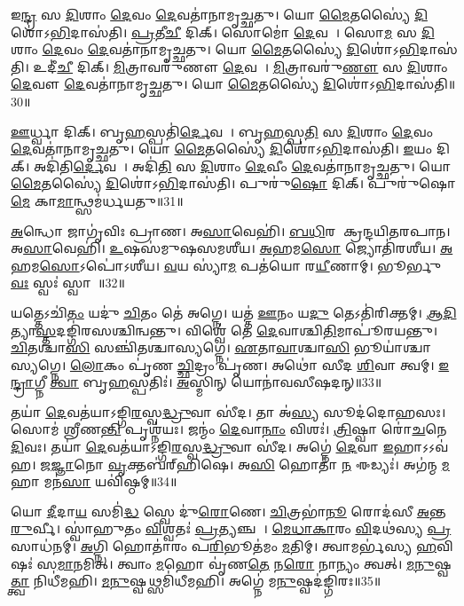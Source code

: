    𑌇\ul{𑌨𑍍𑌦𑍍𑌰}\ul{} 𑌸 \ul{𑌦𑌿}𑌶𑌾𑌂 \ul{𑌦𑍇}𑌵𑌂 \ul{𑌦𑍇}𑌵𑌤𑌾॑𑌨𑌾𑌮𑍃𑌚𑍍𑌛𑌤𑍁।
   𑌯𑍋 \ul{𑌮𑍈}𑌤𑌸𑍍𑌯𑍈॑ \ul{𑌦𑌿}𑌶𑍋॑𑌽\ul{𑌭𑌿}𑌦𑌾𑌸॑𑌤𑌿।
   \ul{𑌪𑍍𑌰}𑌤𑍀\ul{𑌚𑍀} 𑌦𑌿𑌕𑍍।
   𑌸𑍋𑌮𑍋॑ \ul{𑌦𑍇}𑌵𑌤𑌾᳚।
   𑌸𑍋\ul{𑌮}\ul{} 𑌸 \ul{𑌦𑌿}𑌶𑌾𑌂 \ul{𑌦𑍇}𑌵𑌂 \ul{𑌦𑍇}𑌵𑌤𑌾॑𑌨𑌾𑌮𑍃𑌚𑍍𑌛𑌤𑍁।
   𑌯𑍋 \ul{𑌮𑍈}𑌤𑌸𑍍𑌯𑍈॑ \ul{𑌦𑌿}𑌶𑍋॑𑌽\ul{𑌭𑌿}𑌦𑌾𑌸॑𑌤𑌿।
   𑌉𑌦𑍀॑\ul{𑌚𑍀} 𑌦𑌿𑌕𑍍।
   \ul{𑌮𑌿}𑌤𑍍𑌰𑌾𑌵𑌰𑍁॑𑌣𑍗 \ul{𑌦𑍇}𑌵𑌤𑌾᳚।
   \ul{𑌮𑌿}𑌤𑍍𑌰𑌾𑌵𑌰𑍁॑\ul{𑌣𑍗} 𑌸 \ul{𑌦𑌿}𑌶𑌾𑌂 \ul{𑌦𑍇}𑌵𑍗 \ul{𑌦𑍇}𑌵𑌤𑌾॑𑌨𑌾𑌮𑍃𑌚𑍍𑌛𑌤𑍁।
   𑌯𑍋 \ul{𑌮𑍈}𑌤𑌸𑍍𑌯𑍈॑ \ul{𑌦𑌿}𑌶𑍋॑𑌽\ul{𑌭𑌿}𑌦𑌾𑌸॑𑌤𑌿॥30॥

   \ul{𑌊}𑌰𑍍𑌧𑍍𑌵𑌾 𑌦𑌿𑌕𑍍।
   𑌬𑍃\ul{𑌹}𑌸𑍍𑌪𑌤𑌿॑\ul{𑌰𑍍𑌦𑍇}𑌵𑌤𑌾᳚।
   𑌬𑍃\ul{𑌹}𑌸𑍍𑌪\ul{𑌤𑌿}\ul{} 𑌸 \ul{𑌦𑌿}𑌶𑌾𑌂 \ul{𑌦𑍇}𑌵𑌂 \ul{𑌦𑍇}𑌵𑌤𑌾॑𑌨𑌾𑌮𑍃𑌚𑍍𑌛𑌤𑍁।
   𑌯𑍋 \ul{𑌮𑍈}𑌤𑌸𑍍𑌯𑍈॑ \ul{𑌦𑌿}𑌶𑍋॑𑌽\ul{𑌭𑌿}𑌦𑌾𑌸॑𑌤𑌿।
   \ul{𑌇}𑌯𑌂 𑌦𑌿𑌕𑍍।
   𑌅𑌦𑌿॑𑌤𑌿\ul{𑌰𑍍𑌦𑍇}𑌵𑌤𑌾᳚।
   𑌅𑌦𑌿॑\ul{𑌤𑌿}\ul{} 𑌸 \ul{𑌦𑌿}𑌶𑌾𑌂 \ul{𑌦𑍇}𑌵𑍀𑌂 \ul{𑌦𑍇}𑌵𑌤𑌾॑𑌨𑌾𑌮𑍃𑌚𑍍𑌛𑌤𑍁।
   𑌯𑍋 \ul{𑌮𑍈}𑌤𑌸𑍍𑌯𑍈॑ \ul{𑌦𑌿}𑌶𑍋॑𑌽\ul{𑌭𑌿}𑌦𑌾𑌸॑𑌤𑌿।
   𑌪𑍁𑌰𑍁॑\ul{𑌷𑍋} 𑌦𑌿𑌕𑍍।
   𑌪𑍁𑌰𑍁॑𑌷𑍋 \ul{𑌮𑍇} 𑌕𑌾\ul{𑌮𑌾}𑌨𑍍𑌥𑍍𑌸𑌮॑𑌰𑍍𑌧𑌯𑌤𑍁॥31॥
   
   \ul{𑌅}𑌨𑍍𑌧𑍋 𑌜𑌾𑌗𑍃॑𑌵𑌿𑌃 𑌪𑍍𑌰𑌾𑌣।
   𑌅\ul{𑌸𑌾}𑌵𑍇𑌹𑌿॑।
   \ul{𑌬}\ul{𑌧𑌿}𑌰 𑌆᳚𑌕𑍍𑌰𑌨𑍍𑌦𑌯𑌿𑌤𑌰𑌪𑌾𑌨।
   𑌅\ul{𑌸𑌾}𑌵𑍇𑌹𑌿॑।
   \ul{𑌉}𑌷𑌸॑𑌮𑍁𑌷𑌸𑌮𑌶𑍀𑌯।
   \ul{𑌅}𑌹𑌮\ul{𑌸𑍋} 𑌜𑍍𑌯𑍋𑌤𑌿॑𑌰𑌶𑍀𑌯।
   \ul{𑌅}𑌹𑌮\ul{𑌸𑍋}𑌽𑌪𑍋॑𑌽𑌶𑍀𑌯।
   \ul{𑌵}𑌯 𑌸𑍍𑌯𑌾॑\ul{𑌮} 𑌪𑌤॑𑌯𑍋 𑌰\ul{𑌯𑍀}𑌣𑌾𑌮𑍍।
   𑌭𑍂𑌰𑍍𑌭𑍁\ul{𑌵𑌃} 𑌸𑍍𑌵𑌃॑ 𑌸𑍍𑌵𑌾𑌹𑌾᳚॥32॥
\anuvakamend
  
   𑌯𑌤𑍍𑌤𑍇𑌽𑌚𑌿॑\ul{𑌤𑌂} 𑌯𑌦𑍁॑ \ul{𑌚𑌿}𑌤𑌂 𑌤𑍇॑ 𑌅𑌗𑍍𑌨𑍇।
   𑌯𑌤𑍍𑌤॑ \ul{𑌊}𑌨𑌂 𑌯\ul{𑌦𑍁} 𑌤𑍇𑌽𑌤𑌿॑𑌰𑌿𑌕𑍍𑌤𑌮𑍍।
   \ul{𑌆}\ul{𑌦𑌿}𑌤𑍍𑌯𑌾\ul{𑌸𑍍𑌤}𑌦𑌙𑍍𑌗𑌿॑𑌰𑌸𑌶𑍍𑌚𑌿𑌨𑍍𑌵𑌨𑍍𑌤𑍁।
   𑌵𑌿𑌶𑍍𑌵𑍇॑ 𑌤𑍇 \ul{𑌦𑍇}𑌵𑌾𑌶𑍍𑌚𑌿\ul{𑌤𑌿}𑌮𑌾𑌪𑍂॑𑌰𑌯𑌨𑍍𑌤𑍁।
   \ul{𑌚𑌿}𑌤𑌶𑍍𑌚𑌾\ul{𑌸𑌿} 𑌸𑌞𑍍𑌚𑌿॑𑌤𑌶𑍍𑌚𑌾𑌸𑍍𑌯𑌗𑍍𑌨𑍇।
   \ul{𑌏}𑌤𑌾\ul{𑌵𑌾}\ul{}𑌶𑍍𑌚𑌾\ul{𑌸𑌿} 𑌭𑍂𑌯𑌾॑𑌶𑍍𑌚𑌾𑌸𑍍𑌯𑌗𑍍𑌨𑍇।
   \ul{𑌲𑍋}𑌕𑌂 𑌪𑍃॑𑌣 \ul{𑌚𑍍𑌛𑌿}𑌦𑍍𑌰𑌂 𑌪𑍃॑𑌣।
   𑌅𑌥𑍋॑ 𑌸𑍀𑌦 \ul{𑌶𑌿}𑌵𑌾 𑌤𑍍𑌵𑌮𑍍।
   \ul{𑌇}\ul{𑌨𑍍𑌦𑍍𑌰𑌾}𑌗𑍍𑌨𑍀 \ul{𑌤𑍍𑌵𑌾} 𑌬𑍃\ul{𑌹}𑌸𑍍𑌪𑌤𑌿𑌃॑।
   \ul{𑌅}𑌸𑍍𑌮𑌿𑌨𑍍 𑌯𑍋𑌨𑌾॑𑌵𑌸𑍀𑌷𑌦𑌨𑍍॥33॥

   𑌤𑌯𑌾॑ \ul{𑌦𑍇}𑌵𑌤॑𑌯𑌾𑌽𑌙𑍍𑌗𑌿\ul{𑌰}𑌸𑍍𑌵\ul{𑌦𑍍𑌧𑍍𑌰𑍁}𑌵𑌾 𑌸𑍀॑𑌦।
   𑌤𑌾 𑌅॑\ul{𑌸𑍍𑌯} 𑌸𑍂𑌦॑𑌦𑍋𑌹𑌸𑌃।
   𑌸𑍋𑌮॑ 𑌶𑍍𑌰𑍀𑌣\ul{𑌨𑍍𑌤𑌿} 𑌪𑍃𑌶𑍍𑌨॑𑌯𑌃।
   𑌜𑌨𑍍𑌮𑌂॑ \ul{𑌦𑍇}𑌵𑌾\ul{𑌨𑌾𑌂} 𑌵𑌿𑌶𑌃॑।
   \ul{𑌤𑍍𑌰𑌿}𑌷𑍍𑌵𑌾 𑌰𑍋॑\ul{𑌚}𑌨𑍇 \ul{𑌦𑌿}𑌵𑌃।
   𑌤𑌯𑌾॑ \ul{𑌦𑍇}𑌵𑌤॑𑌯𑌾𑌽𑌙𑍍𑌗𑌿\ul{𑌰}𑌸𑍍𑌵\ul{𑌦𑍍𑌧𑍍𑌰𑍁}𑌵𑌾 𑌸𑍀॑𑌦।
   𑌅𑌗𑍍𑌨𑍇॑ \ul{𑌦𑍇}𑌵𑌾 \ul{𑌇}𑌹𑌾𑌽𑌽𑌵॑𑌹।
   \ul{𑌜}\ul{𑌜𑍍𑌞𑌾}𑌨𑍋 \ul{𑌵𑍃}𑌕𑍍𑌤𑌬॑𑌰𑍍{‌}𑌹𑌿𑌷𑍇।
   𑌅\ul{𑌸𑌿} 𑌹𑍋𑌤𑌾॑ \ul{𑌨} 𑌈𑌡𑍍𑌯𑌃॑।
   𑌅𑌗॑𑌨𑍍𑌮 \ul{𑌮}𑌹𑌾 𑌮𑌨॑\ul{𑌸𑌾} 𑌯𑌵𑌿॑𑌷𑍍𑌠𑌮𑍍॥34॥

   𑌯𑍋 \ul{𑌦𑍀}𑌦𑌾\ul{𑌯} 𑌸𑌮𑌿॑\ul{𑌦𑍍𑌧} 𑌸𑍍𑌵𑍇 𑌦𑍁॑\ul{𑌰𑍋}𑌣𑍇।
   \ul{𑌚𑌿}𑌤𑍍𑌰𑌭𑌾॑\ul{𑌨𑍂} 𑌰𑍋𑌦॑𑌸𑍀 \ul{𑌅}𑌨𑍍𑌤\ul{𑌰𑍁}𑌰𑍍𑌵𑍀।
   𑌸𑍍𑌵𑌾॑𑌹𑍁𑌤𑌂 \ul{𑌵𑌿}𑌶𑍍𑌵𑌤𑌃॑ \ul{𑌪𑍍𑌰}𑌤𑍍𑌯𑌞𑍍𑌚𑌮𑍍᳚।
   \ul{𑌮𑍇}\ul{𑌧𑌾}\ul{𑌕𑌾}𑌰𑌂 \ul{𑌵𑌿}𑌦𑌥॑𑌸𑍍𑌯 \ul{𑌪𑍍𑌰}𑌸𑌾𑌧॑𑌨𑌮𑍍।
   \ul{𑌅}𑌗𑍍𑌨𑌿 𑌹𑍋𑌤𑌾॑𑌰𑌂 𑌪\ul{𑌰𑌿}𑌭𑍂𑌤॑𑌮𑌂 \ul{𑌮}𑌤𑌿𑌮𑍍।
   𑌤𑍍𑌵𑌾𑌮𑌰𑍍𑌭॑𑌸𑍍𑌯 \ul{𑌹}𑌵𑌿𑌷𑌃॑ 𑌸\ul{𑌮𑌾}𑌨𑌮𑌿𑌤𑍍।
   𑌤𑍍𑌵𑌾𑌂 \ul{𑌮}𑌹𑍋 𑌵𑍃॑𑌣\ul{𑌤𑍇} 𑌨\ul{𑌰𑍋} 𑌨𑌾𑌨𑍍𑌯𑌂 𑌤𑍍𑌵𑌤𑍍।
   \ul{𑌮}\ul{𑌨𑍁}𑌷𑍍𑌵\ul{𑌤𑍍𑌤𑍍𑌵𑌾} 𑌨𑌿𑌧𑍀॑𑌮𑌹𑌿।
   \ul{𑌮}\ul{𑌨𑍁}𑌷𑍍𑌵𑌥𑍍𑌸𑌮𑌿॑𑌧𑍀𑌮𑌹𑌿।
   𑌅𑌗𑍍𑌨𑍇॑ 𑌮\ul{𑌨𑍁}𑌷𑍍𑌵𑌦॑𑌙𑍍𑌗𑌿𑌰𑌃॥35॥

